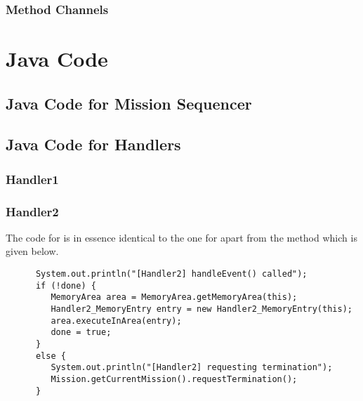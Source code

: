 \documentclass{article}
\begin{document}
\begin{circusbox}

\end{circusbox}

\subsubsection{Method Channels}
\vspace{-0.5em}

\begin{circusbox}

\end{circusbox}


\section{Java Code}

\subsection{Java Code for Mission Sequencer}


\subsection{Java Code for Handlers}

\subsubsection{Handler1}


\subsubsection{Handler2}

The code for  is in essence identical to the one for  apart from the  method which is given below.

\begin{verbatim}
      System.out.println("[Handler2] handleEvent() called");
      if (!done) {
         MemoryArea area = MemoryArea.getMemoryArea(this);
         Handler2_MemoryEntry entry = new Handler2_MemoryEntry(this);
         area.executeInArea(entry);
         done = true;
      }
      else {
         System.out.println("[Handler2] requesting termination");
         Mission.getCurrentMission().requestTermination();         
      }
\end{verbatim}
\end{document}

